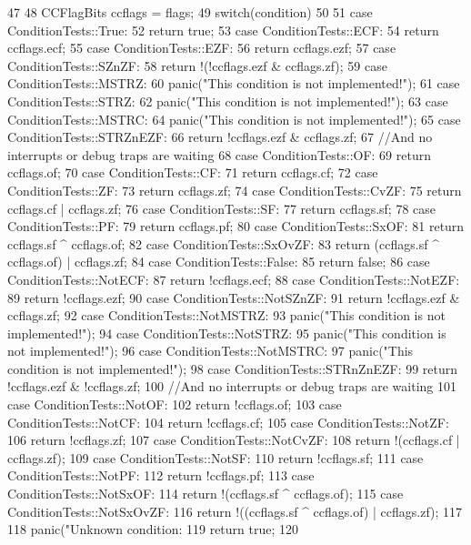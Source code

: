 \begin{DoxyCode}
47     {
48         CCFlagBits ccflags = flags;
49         switch(condition)
50         {
51           case ConditionTests::True:
52             return true;
53           case ConditionTests::ECF:
54             return ccflags.ecf;
55           case ConditionTests::EZF:
56             return ccflags.ezf;
57           case ConditionTests::SZnZF:
58             return !(!ccflags.ezf & ccflags.zf);
59           case ConditionTests::MSTRZ:
60             panic("This condition is not implemented!");
61           case ConditionTests::STRZ:
62             panic("This condition is not implemented!");
63           case ConditionTests::MSTRC:
64             panic("This condition is not implemented!");
65           case ConditionTests::STRZnEZF:
66             return !ccflags.ezf & ccflags.zf;
67                 //And no interrupts or debug traps are waiting
68           case ConditionTests::OF:
69             return ccflags.of;
70           case ConditionTests::CF:
71             return ccflags.cf;
72           case ConditionTests::ZF:
73             return ccflags.zf;
74           case ConditionTests::CvZF:
75             return ccflags.cf | ccflags.zf;
76           case ConditionTests::SF:
77             return ccflags.sf;
78           case ConditionTests::PF:
79             return ccflags.pf;
80           case ConditionTests::SxOF:
81             return ccflags.sf ^ ccflags.of;
82           case ConditionTests::SxOvZF:
83             return (ccflags.sf ^ ccflags.of) | ccflags.zf;
84           case ConditionTests::False:
85             return false;
86           case ConditionTests::NotECF:
87             return !ccflags.ecf;
88           case ConditionTests::NotEZF:
89             return !ccflags.ezf;
90           case ConditionTests::NotSZnZF:
91             return !ccflags.ezf & ccflags.zf;
92           case ConditionTests::NotMSTRZ:
93             panic("This condition is not implemented!");
94           case ConditionTests::NotSTRZ:
95             panic("This condition is not implemented!");
96           case ConditionTests::NotMSTRC:
97             panic("This condition is not implemented!");
98           case ConditionTests::STRnZnEZF:
99             return !ccflags.ezf & !ccflags.zf;
100                 //And no interrupts or debug traps are waiting
101           case ConditionTests::NotOF:
102             return !ccflags.of;
103           case ConditionTests::NotCF:
104             return !ccflags.cf;
105           case ConditionTests::NotZF:
106             return !ccflags.zf;
107           case ConditionTests::NotCvZF:
108             return !(ccflags.cf | ccflags.zf);
109           case ConditionTests::NotSF:
110             return !ccflags.sf;
111           case ConditionTests::NotPF:
112             return !ccflags.pf;
113           case ConditionTests::NotSxOF:
114             return !(ccflags.sf ^ ccflags.of);
115           case ConditionTests::NotSxOvZF:
116             return !((ccflags.sf ^ ccflags.of) | ccflags.zf);
117         }
118         panic("Unknown condition: %
119         return true;
120     }
\end{DoxyCode}
